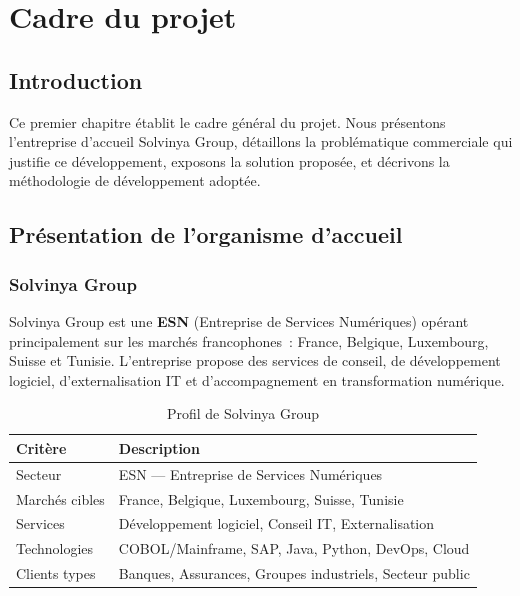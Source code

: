 \chapter{Cadre du projet}
\setcounter{chapter}{1}
\minitoc
\newpage

\section{Introduction}

Ce premier chapitre établit le cadre général du projet. Nous présentons
l'entreprise d'accueil Solvinya Group, détaillons la problématique commerciale
qui justifie ce développement, exposons la solution proposée, et décrivons
la méthodologie de développement adoptée.

\section{Présentation de l'organisme d'accueil}

\subsection{Solvinya Group}

Solvinya Group est une \textbf{ESN} (Entreprise de Services Numériques) opérant
principalement sur les marchés francophones~: France, Belgique, Luxembourg,
Suisse et Tunisie. L'entreprise propose des services de conseil, de développement
logiciel, d'externalisation IT et d'accompagnement en transformation numérique.

\begin{table}[H]
  \centering
  \begin{tabular}{L{4cm} L{9cm}}
    \toprule
    \textbf{Critère} & \textbf{Description} \\
    \midrule
    Secteur & ESN — Entreprise de Services Numériques \\
    Marchés cibles & France, Belgique, Luxembourg, Suisse, Tunisie \\
    Services & Développement logiciel, Conseil IT, Externalisation \\
    Technologies & COBOL/Mainframe, SAP, Java, Python, DevOps, Cloud \\
    Clients types & Banques, Assurances, Groupes industriels, Secteur public \\
    \bottomrule
  \end{tabular}
  \caption{Profil de Solvinya Group}
  \label{tab:solvinya}
\end{table}

